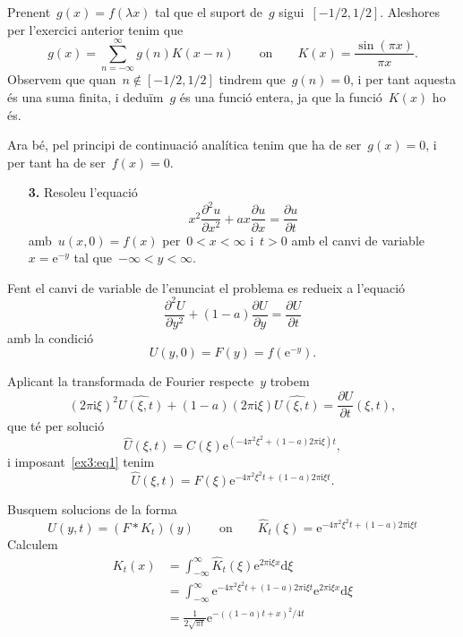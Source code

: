 \documentclass[a4paper]{article}
\theoremstyle{plain}
\theoremstyle{definition}
\newcommand{\iu}{\mathrm{i}}
\newcommand{\e}{\mathrm{e}}
\providecommand{\uppi}{\pi}
\newcommand{\diff}{\mathrm{d}}
\begin{document}
Prenent~\(g(x)=f(\lambda x)\) tal que el suport de~\(g\) sigui~\([-1/2,1/2]\).
Aleshores per l'exercici anterior tenim que
\[
    g(x)
    =
    \sum_{n=-\infty}^{\infty}
    g(n)
    K(x-n)
    \qquad\text{on}\qquad
    K(x)
    =
    \frac{\sin(\uppi x)}{\uppi x}.
\]
Observem que quan~\(n\notin[-1/2,1/2]\) tindrem que~\(g(n)=0\), i per tant
aquesta és una suma finita, i deduïm~\(g\) és una funció entera, ja que la
funció~\(K(x)\) ho és.

Ara bé, pel principi de continuació analítica tenim que ha de ser~\(g(x)=0\),
i per tant ha de ser~\(f(x)=0\).

\begin{enumerate}
    \item[\textbf{3.}] Resoleu l'equació
        \[
            x^{2}\frac{\partial^{2}u}{\partial x^{2}}
            + ax\frac{\partial u}{\partial x}
            = \frac{\partial u}{\partial t}
        \]
        amb~\(u(x,0) = f(x)\) per~\(0<x<\infty\) i~\(t>0\) amb el canvi de
        variable~\(x=\e^{-y}\) tal que~\(-\infty<y<\infty\).
\end{enumerate}

Fent el canvi de variable de l'enunciat el problema es redueix a l'equació
\[
    \frac{\partial^{2} U}{\partial y^{2}}
    +
    (1 - a)
    \frac{\partial U}{\partial y}
    =
    \frac{\partial U}{\partial t}
\]
amb la condició
\begin{equation}
    \label{ex3:eq1}
    U(y,0) = F(y) = f(\e^{-y}).
\end{equation}

Aplicant la transformada de Fourier respecte~\(y\) trobem
\[
    (2\uppi\iu\xi)^{2}
    \widehat{U(\xi,t)}
    +
    (1 - a)
    (2\uppi\iu\xi)
    \widehat{U(\xi,t)}
    =
    \frac{\partial U}{\partial t}
    (\xi,t),
\]
que té per solució
\[
    \widehat{U}(\xi,t)
    =
    C(\xi)
    \e^{(-4\uppi^{2}\xi^{2}+(1-a)2\uppi\iu\xi)t},
\]
i imposant~\eqref{ex3:eq1} tenim
\[
    \widehat{U}(\xi,t)
    =
    F(\xi)
    \e^{-4\uppi^{2}\xi^{2}t+(1-a)2\uppi\iu\xi t}.
\]

Busquem solucions de la forma
\[
    U(y,t)
    =
    (F\ast K_{t})(y)
    \qquad\text{on}\qquad
    \widehat{K}_{t}(\xi)
    =
    \e^{-4\uppi^{2}\xi^{2}t+(1-a)2\uppi\iu\xi t}
\]
Calculem
\begin{align*}
    K_{t}(x) &= \int_{-\infty}^{\infty}
                \widehat{K}_{t}(\xi)
                \e^{2\uppi\iu\xi x}
                \diff\xi \\
             &= \int_{-\infty}^{\infty}
                \e^{-4\uppi^{2}\xi^{2}t+(1-a)2\uppi\iu\xi t}
                \e^{2\uppi\iu\xi x}
                \diff\xi \\
             &= \frac{1}{2\sqrt{\uppi t}}
             \e^{-{((1-a)t+x)^{2}}/{4t}}
\end{align*}
\end{document}

